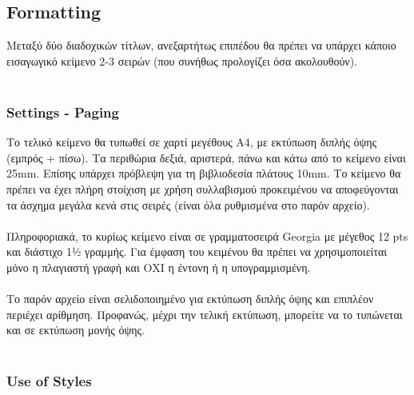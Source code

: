 \subsection{Formatting}

\begin{flushleft}
    Μεταξύ δύο διαδοχικών τίτλων, ανεξαρτήτως επιπέδου θα πρέπει να υπάρχει κάποιο εισαγωγικό κείμενο 2-3 σειρών (που συνήθως προλογίζει όσα ακολουθούν).  \\~\\
\end{flushleft}

\subsubsection{Settings - Paging}

\begin{flushleft}
    Το τελικό κείμενο θα τυπωθεί σε χαρτί μεγέθους Α4, με εκτύπωση διπλής όψης (εμπρός + πίσω). Τα περιθώρια δεξιά, αριστερά, πάνω και κάτω από το κείμενο είναι 25mm. Επίσης υπάρχει πρόβλεψη για τη βιβλιοδεσία πλάτους 10mm. Το κείμενο θα πρέπει να έχει πλήρη στοίχιση με χρήση συλλαβισμού προκειμένου να αποφεύγονται τα άσχημα μεγάλα κενά στις σειρές (είναι όλα ρυθμισμένα στο παρόν αρχείο). \\~\\

    Πληροφοριακά, το κυρίως κείμενο είναι σε γραμματοσειρά Georgia με μέγεθος 12 pts και διάστιχο 1½ γραμμής. Για έμφαση του κειμένου θα πρέπει να χρησιμοποιείται μόνο η πλαγιαστή γραφή και ΟΧΙ η έντονη ή η υπογραμμισμένη. \\~\\
    
    Το παρόν αρχείο είναι σελιδοποιημένο για εκτύπωση διπλής όψης και επιπλέον περιέχει αρίθμηση. Προφανώς, μέχρι την τελική εκτύπωση, μπορείτε να το τυπώνεται και σε εκτύπωση μονής όψης. \\~\\
\end{flushleft}


\subsubsection{Use of Styles}


